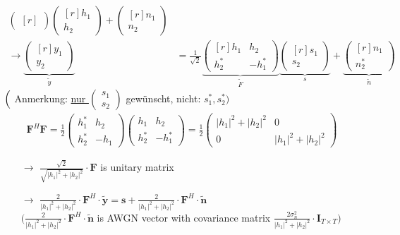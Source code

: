 \documentclass[a4paper, 10pt]{article}
\begin{document}
\begin{itemize}
\begin{itemize}
\begin{align*}
\begin{pmatrix*}[r]
			\end{pmatrix*}
			\begin{pmatrix*}[r]h_1\\h_2
			\end{pmatrix*} + 
			\begin{pmatrix*}[r]n_1\\n_2
			\end{pmatrix*}\\
			\rightarrow 
			\underbrace{
			\begin{pmatrix*}[r]y_1\\y_2
			\end{pmatrix*}}_{\tilde y} &= \frac{1}{\sqrt{2}}
			\underbrace{
			\begin{pmatrix*}[r]h_1 & h_2\\h_2^* & -h_1^*
			\end{pmatrix*}}_{\tilde F}
			\underbrace{
			\begin{pmatrix*}[r]s_1\\s_2
			\end{pmatrix*}}_{s} + 
			\underbrace{
			\begin{pmatrix*}[r]n_1\\n_2^*
			\end{pmatrix*}}_{\tilde n}
		\end{align*}
		$\Bigl ( $ Anmerkung: \underline{nur } $\begin{pmatrix}s_1 \\s_2 \end{pmatrix} $ gew\"unscht, nicht: $s_1^*, s_2^* \Bigr ) $
		\begin{align*}
			\textbf{F}^H\textbf{F} = \frac{1}{2}\begin{pmatrix}h_1^* & h_2\\h_2^* & -h_1\end{pmatrix}\begin{pmatrix}h_1 & h_2\\h_2^* & -h_1^* \end{pmatrix} = \frac{1}{2}\begin{pmatrix} |h_1|^2 + |h_2|^2 & 0\\0 & |h_1|^2 + |h_2|^2\end{pmatrix}		 								
		\end{align*}
		\begin{itemize}
			\item[$\rightarrow$] $\frac{\sqrt{2}}{\sqrt{|h_1|^2 + |h_2|^2}}\cdot \textbf{F} $ is unitary matrix 
			\item[$\rightarrow$] $\frac{2}{|h_1|^2 + |h_2|^2}\cdot \textbf{F}^H\cdot \tilde{\textbf{y}} = \textbf{s} + \frac{2}{|h_1|^2 + |h_2|^2}\cdot \textbf{F}^H\cdot\tilde{\textbf{n}}$ \\  $\bigl ( \frac{2}{|h_1|^2 + |h_2|^2}\cdot \textbf{F}^H\cdot\tilde{\textbf{n}}$ is AWGN vector with covariance matrix $\frac{2\sigma_n^2}{|h_1|^2 + |h_2|^2}\cdot \textbf{I}_{T\times T} \bigr)$

\end{itemize}
\end{itemize}
\end{itemize}
\end{document}
